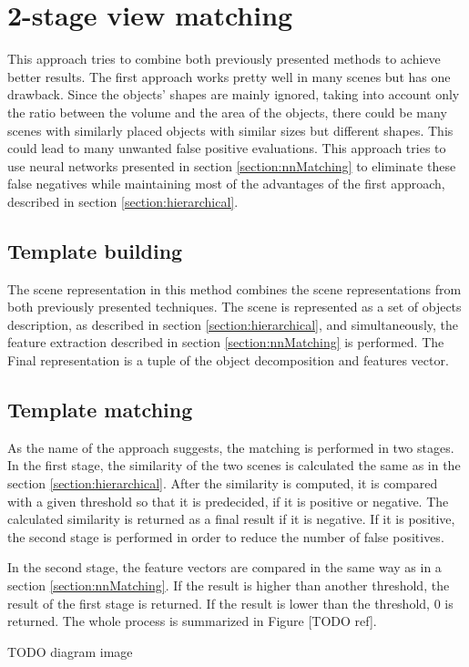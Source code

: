 \section{2-stage view matching}\label{section:2stage}

This approach tries to combine both previously presented methods to achieve better results. The first approach works pretty well in many scenes but has one drawback. Since the objects' shapes are mainly ignored, taking into account only the ratio between the volume and the area of the objects, there could be many scenes with similarly placed objects with similar sizes but different shapes. This could lead to many unwanted false positive evaluations. This approach tries to use neural networks presented in section \ref{section:nnMatching} to eliminate these false negatives while maintaining most of the advantages of the first approach, described in section \ref{section:hierarchical}.\par

\subsection{Template building}

The scene representation in this method combines the scene representations from both previously presented techniques. The scene is represented as a set of objects description, as described in section \ref{section:hierarchical}, and simultaneously, the feature extraction described in section \ref{section:nnMatching} is performed. The Final representation is a tuple of the object decomposition and features vector.

\subsection{Template matching}

As the name of the approach suggests, the matching is performed in two stages. In the first stage, the similarity of the two scenes is calculated the same as in the section \ref{section:hierarchical}. After the similarity is computed, it is compared with a given threshold so that it is predecided, if it is positive or negative. The calculated similarity is returned as a final result if it is negative. If it is positive, the second stage is performed in order to reduce the number of false positives.\par
In the second stage, the feature vectors are compared in the same way as in a section \ref{section:nnMatching}. If the result is higher than another threshold, the result of the first stage is returned. If the result is lower than the threshold, 0 is returned. The whole process is summarized in Figure [TODO ref].

TODO diagram image
